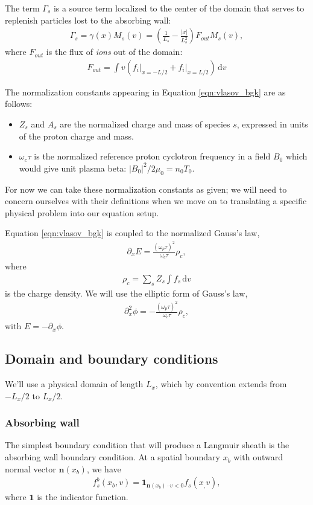 \documentclass{article}
\begin{document}
The term $\Gamma_s$ is a source term localized to the center of the domain that serves to replenish particles lost to
the absorbing wall:
\begin{align*}
    \Gamma_s = \gamma(x) M_s(v) = \left( \frac{1}{L_s} - \frac{|x|}{L_s^2} \right) F_{out} M_s(v),
\end{align*}
where $F_{out}$ is the flux of \emph{ions} out of the domain:
\begin{align*}
    F_{out} = \int v \left( f_i \vert_{x=-L/2} + f_i \vert_{x=L/2} \right) \, \mathrm{d} v
\end{align*}

The normalization constants appearing in Equation \eqref{eqn:vlasov_bgk} are as follows:
\begin{itemize}
    \item $Z_s$ and $A_s$ are the normalized charge and mass of species $s$, expressed in units of the proton charge and mass.
    \item $\omega_c \tau$ is the normalized reference proton cyclotron frequency in a field $B_0$ which would give unit plasma beta: $|B_0|^2 / 2 \mu_0 = n_0 T_0$.
\end{itemize}
For now we can take these normalization constants as given; we will need to concern ourselves with their definitions when we
move on to translating a specific physical problem into our equation setup.

Equation \eqref{eqn:vlasov_bgk} is coupled to the normalized Gauss's law,
\begin{align}
\partial_x E = \frac{(\omega_p \tau)^2}{\omega_c \tau} \rho_c,
\end{align}
where
\begin{align}
    \rho_c = \sum_s Z_s \int f_s \,\mathrm{d} v
\end{align}
is the charge density.
We will use the elliptic form of Gauss's law,
\begin{align}
\partial_x^2 \phi = -\frac{(\omega_p \tau)^2}{\omega_c \tau} \rho_c,
\end{align}
with $E = -\partial_x \phi$.

\subsection{Domain and boundary conditions}

We'll use a physical domain of length $L_x$, which by convention extends from $-L_x/2$ to $L_x/2$.

\subsubsection{Absorbing wall}
The simplest boundary condition that will produce a Langmuir sheath is the absorbing wall
boundary condition. At a spatial boundary $x_b$ with outward normal vector $\mathbf{n}(x_b)$, we have
\begin{align}
    f_s^b(x_b, v) = \mathbf{1}_{\mathbf{n}(x_b) \cdot v < 0} f_s(x_, v),
\end{align}
where $\mathbf{1}$ is the indicator function.
\end{document}
